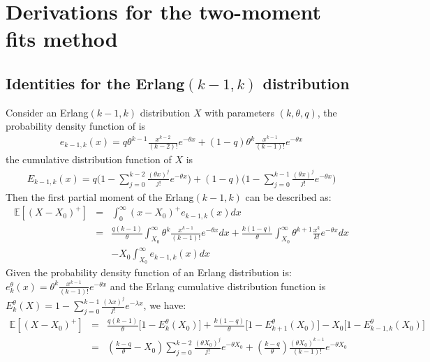 \documentclass[preprint,12pt]{elsarticle}
\begin{document}
\begin{appendices}
\begin{description}
\end{description}

\section{Derivations for the two-moment fits method}
\label{AG}

\subsection{Identities for the Erlang$(k-1,k)$ distribution}
\label{appendix:erlongk-1}
Consider an Erlang$(k-1,k)$ distribution $X$ with parameters $(k,\theta,q)$, the probability density function of is
\begin{eqnarray}
e_{k-1,k}(x)=q\theta^{k-1}\frac{x^{k-2}}{(k-2)!}e^{-\theta x} + (1-q)\theta^{k}\frac{x^{k-1}}{(k-1)!}e^{-\theta x} \nonumber
\end{eqnarray}
the cumulative distribution function of $X$ is
\begin{eqnarray}
E_{k-1,k}(x)=q\bigg(1-\sum_{j=0}^{k-2}\frac{(\theta x)^{j}}{j!}e^{-\theta x} \bigg)+(1-q)\bigg(1-\sum_{j=0}^{k-1}\frac{(\theta x)^{j}}{j!}e^{-\theta x} \bigg) \nonumber
\end{eqnarray}
Then the first partial moment of the Erlang$(k-1,k)$ can be described as:
\begin{eqnarray}
\mathbb{E}{[(X-X_{0})^{+}]} &=& \int_{0}^{\infty}{(x-X_{0})^{+}e_{k-1,k}(x)d x} \nonumber\\
&=& \frac{q(k-1)}{\theta}\int_{X_{0}}^{\infty}{\theta^{k}\frac{x^{k-1}}{(k-1)!}e^{-\theta x}dx}+\frac{k(1-q)}{\theta}\int_{X_0}^{\infty}{\theta^{k+1}\frac{x^{k}}{k!}e^{-\theta x}dx}\nonumber\\
&&-X_{0}\int_{X_{0}}^{\infty}{e_{k-1,k}(x)dx}\nonumber
\end{eqnarray}
Given the probability density function of an Erlang distribution is: $e_{k}^{\theta}(x)=\theta^{k}\frac{x^{k-1}}{(k-1)!}e^{-\theta x}$ and the Erlang cumulative distribution function is $E_{k}^{\theta}(X) = 1-\sum_{j=0}^{k-1}{\frac{(\lambda x)^{j}}{j!}e^{-\lambda x}}$, we have:
\begin{eqnarray}
\mathbb{E}{[(X-X_{0})^{+}]}
&=& \frac{q(k-1)}{\theta}\bigg[1-E_{k}^{\theta}(X_{0})\bigg]+\frac{k(1-q)}{\theta}\bigg[1-E_{k+1}^{\theta}(X_{0})\bigg]-X_{0}\bigg[1-E_{k-1,k}^{\theta}(X_{0})\bigg] \nonumber\\
&=&(\frac{k-q}{\theta}-X_{0})\sum_{j=0}^{k-2}{\frac{(\theta X_{0})^j}{j!}e^{-\theta X_{0}}}+(\frac{k-q}{\theta})\frac{(\theta X_{0})^{k-1}}{(k-1)!}e^{-\theta X_{0}}\nonumber
\end{eqnarray}



\end{appendices}
\end{document}
